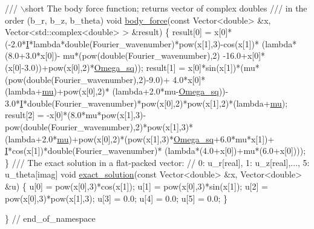 \begin{DoxyCodeInclude}
 \textcolor{comment}{}
\textcolor{comment}{ /// \(\backslash\)short The body force function; returns vector of complex doubles}
\textcolor{comment}{ /// in the order (b\_r, b\_z, b\_theta)}
\textcolor{comment}{} \textcolor{keywordtype}{void} \hyperlink{namespaceGlobal__Parameters_a8d30973505eeb753023936398bce5bcc}{body\_force}(\textcolor{keyword}{const} Vector<double> &x,
                 Vector<std::complex<double> > &result)
 \{
  result[0] = 
   x[0]*(-2.0*\hyperlink{namespaceGlobal__Parameters_a2ceef30cf51dfd432bafde39945a4e45}{I}*lambda*double(Fourier\_wavenumber)*pow(x[1],3)-cos(x[1])*
         (lambda*(8.0+3.0*x[0])-
          mu*(pow(\textcolor{keywordtype}{double}(Fourier\_wavenumber),2)
              -16.0+x[0]*(x[0]-3.0))+pow(x[0],2)*\hyperlink{namespaceGlobal__Parameters_aa7f960ed4311ccf6e3dbf9371f13876a}{Omega\_sq}));
  result[1] = 
   x[0]*sin(x[1])*(mu*(pow(\textcolor{keywordtype}{double}(Fourier\_wavenumber),2)-9.0)+
                   4.0*x[0]*(lambda+\hyperlink{namespaceGlobal__Parameters_a49a27047b96fb3d9ec374f7649e46d89}{mu})+pow(x[0],2)*
                   (lambda+2.0*mu-\hyperlink{namespaceGlobal__Parameters_aa7f960ed4311ccf6e3dbf9371f13876a}{Omega\_sq}))-
   3.0*\hyperlink{namespaceGlobal__Parameters_a2ceef30cf51dfd432bafde39945a4e45}{I}*double(Fourier\_wavenumber)*pow(x[0],2)*pow(x[1],2)*(lambda+\hyperlink{namespaceGlobal__Parameters_a49a27047b96fb3d9ec374f7649e46d89}{mu});
  result[2] = 
   -x[0]*(8.0*mu*pow(x[1],3)-pow(\textcolor{keywordtype}{double}(Fourier\_wavenumber),2)*pow(x[1],3)*
          (lambda+2.0*\hyperlink{namespaceGlobal__Parameters_a49a27047b96fb3d9ec374f7649e46d89}{mu})+pow(x[0],2)*(pow(x[1],3)*\hyperlink{namespaceGlobal__Parameters_aa7f960ed4311ccf6e3dbf9371f13876a}{Omega\_sq}+6.0*mu*x[1])+
          \hyperlink{namespaceGlobal__Parameters_a2ceef30cf51dfd432bafde39945a4e45}{I}*cos(x[1])*double(Fourier\_wavenumber)*
          (lambda*(4.0+x[0])+mu*(6.0+x[0])));
 \}
 \textcolor{comment}{}
\textcolor{comment}{ /// The exact solution in a flat-packed vector:}
\textcolor{comment}{} \textcolor{comment}{// 0: u\_r[real], 1: u\_z[real],..., 5: u\_theta[imag]}
 \textcolor{keywordtype}{void} \hyperlink{namespaceGlobal__Parameters_a6e53a9e4370e8719e9091eff6b6a0c01}{exact\_solution}(\textcolor{keyword}{const} Vector<double> &x,
                     Vector<double> &u)
 \{
  u[0] = pow(x[0],3)*cos(x[1]);
  u[1] = pow(x[0],3)*sin(x[1]);
  u[2] = pow(x[0],3)*pow(x[1],3);
  u[3] = 0.0;
  u[4] = 0.0;
  u[5] = 0.0;
 \}

\} \textcolor{comment}{// end\_of\_namespace}

\end{DoxyCodeInclude}




